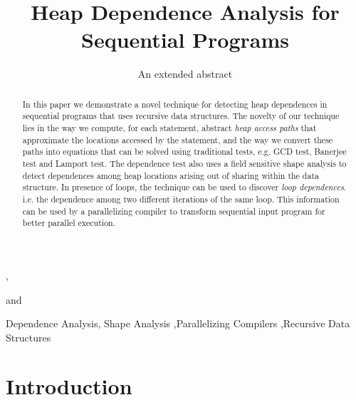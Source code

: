 \documentclass{IOS-Book-Article}
\begin{document}
\begin{frontmatter}                           %

\title{Heap Dependence Analysis for Sequential Programs}
%
\subtitle{An extended abstract}

\author{ },
\author{ }
and
\author{ }

\address{{\tt \{barnali, dsand, karkare\}@cse.iitk.ac.in}\\
  Department of CSE, IIT Kanpur, India}

\begin{abstract}
In this paper we demonstrate a novel technique for detecting
heap dependences in sequential programs that uses recursive
data structures.  The novelty of our technique lies in the
way we compute, for each statement, abstract {\em heap access
  paths} that approximate the locations accessed by the
statement, and the way we convert these paths into equations
that can be solved using traditional tests, e.g. GCD test,
Banerjee test and Lamport test.  The dependence test also
uses a field sensitive shape analysis to detect dependences
among heap locations arising out of sharing within the data
structure. In presence of loops, the technique can be used to
discover {\em loop dependences}.  i.e. the dependence among
two different iterations of the same loop. This information
can be used by a parallelizing compiler to transform
sequential input program for better parallel execution.
\end{abstract}

\begin{keyword}
Dependence Analysis\sep
Shape Analysis \sep {Parallelizing
  Compilers} \sep {Recursive Data Structures}
\end{keyword}
\end{frontmatter}

\thispagestyle{empty}
\pagestyle{empty}

\section{Introduction}
\end{document}
